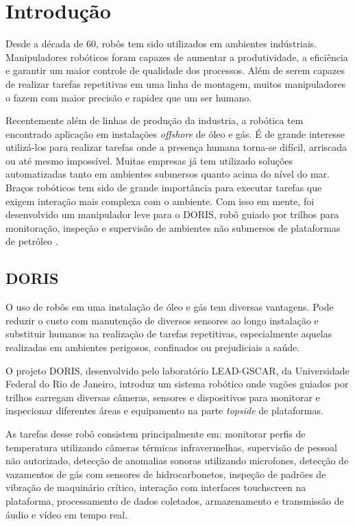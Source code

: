 \chapter{Introdução}

Desde a década de 60, robôs tem sido utilizados em ambientes indústriais. Manipuladores robóticos foram capazes de aumentar a produtividade, a eficiência e garantir um maior controle de qualidade dos processos. Além de serem capazes de realizar tarefas repetitivas em uma linha de montagem, muitos manipuladores o fazem com maior precisão e rapidez que um ser humano. 

Recentemente além de linhas de produção da industria, a robótica tem encontrado aplicação em instalações \textit{offshore} de óleo e gás. É de grande interesse utilizá-los para realizar tarefas onde a presença humana torna-se difícil, arriscada ou até mesmo impossível. Muitas empresas já tem utilizado soluções automatizadas tanto em ambientes submersos quanto acima do nível do mar. Braços robóticos tem sido de grande importância para executar tarefas que exigem interação mais complexa com o ambiente. Com isso em mente, foi desenvolvido um manipulador leve para o DORIS, robô guiado por trilhos para monitoração, inspeção e supervisão de ambientes não submersos de plataformas de petróleo \cite{xaud2016doris}.

\section{DORIS}
O uso de robôs em uma instalação de óleo e gás tem diversas vantagens. Pode reduzir o custo com manutenção de diversos sensores ao longo instalação e substituir humanos na realização de tarefas repetitivas, especialmente aquelas realizadas em ambientes perigosos, confinados ou prejudiciais a saúde. 

O projeto DORIS, desenvolvido pelo laboratório LEAD-GSCAR, da Universidade Federal do Rio de Janeiro, introduz um sistema robótico onde vagões guiados por trilhos carregam diversas câmeras, sensores e dispositivos para monitorar e inspecionar diferentes áreas e equipamento na parte \textit{topside} de plataformas.

As tarefas desse robô consistem principalmente em: monitorar perfis de temperatura utilizando câmeras térmicas infravermelhas, supervisão de pessoal não autorizado, detecção de anomalias sonoras utilizando microfones, detecção de vazamentos de gás com sensores de hidrocarbonetos, inspeção de padrões de vibração de maquinário crítico, interação com interfaces touchscreen na plataforma, processamento de dados coletados, armazenamento e transmissão de áudio e vídeo em tempo real.

